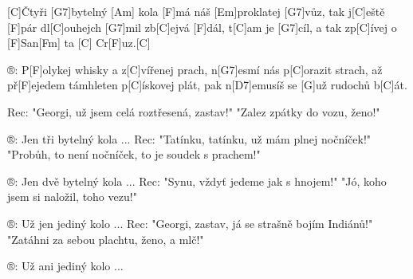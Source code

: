 
[C]\null Čtyři  [G7]bytelný [Am] kola [F]má náš [Em]proklatej [G7]vůz,
tak j[C]eště [F]pár dl[C]ouhejch [G7]mil zb[C]ejvá [F]dál, t[C]am je [G7]cíl,
a tak zp[C]\null ívej o [F]San[Fm] ta [C] Cr[F]uz.[C]

®: P[F]olykej whisky a z[C]vířenej prach,
n[G7]esmí nás p[C]orazit strach,
až př[F]ejedem támhleten p[C]\null ískovej plát,
pak n[D7]emusíš se [G]už rudochů b[C]\null át.

Rec: "Georgi, už jsem celá roztřesená, zastav!"
"Zalez zpátky do vozu, ženo!"

®: Jen tři bytelný kola ...
Rec: "Tatínku, tatínku, už mám plnej nočníček!"
"Probůh, to není nočníček, to je soudek s prachem!"

®: Jen dvě bytelný kola ...
Rec: "Synu, vždyť jedeme jak s hnojem!"
"Jó, koho jsem si naložil, toho vezu!"

®: Už jen jediný kolo ...
Rec: "Georgi, zastav, já se strašně bojím Indiánů!"
"Zatáhni za sebou plachtu, ženo, a mlč!"

®: Už ani jediný kolo ...

